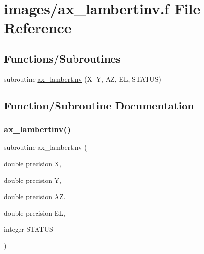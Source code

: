 \hypertarget{ax__lambertinv_8f}{}\section{images/ax\+\_\+lambertinv.f File Reference}
\label{ax__lambertinv_8f}
\subsection*{Functions/\+Subroutines}
\begin{DoxyCompactItemize}
\item 
subroutine \hyperlink{ax__lambertinv_8f_abf1b33bf897847e7c8872b417d1d5373}{ax\+\_\+lambertinv} (X, Y, AZ, EL, S\+T\+A\+T\+US)
\end{DoxyCompactItemize}


\subsection{Function/\+Subroutine Documentation}
\mbox{\label{ax__lambertinv_8f_abf1b33bf897847e7c8872b417d1d5373}} 
\subsubsection{\texorpdfstring{ax\+\_\+lambertinv()}{ax\_lambertinv()}}
{\footnotesize\ttfamily subroutine ax\+\_\+lambertinv (\begin{DoxyParamCaption}\item[{double precision}]{X,  }\item[{double precision}]{Y,  }\item[{double precision}]{AZ,  }\item[{double precision}]{EL,  }\item[{integer}]{S\+T\+A\+T\+US }\end{DoxyParamCaption})}

